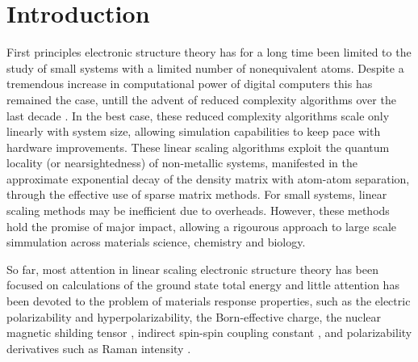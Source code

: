 \documentclass[prl,aps,letterpaper,twocolumn,showpacs,twocolumngrid,superbib]{revtex4}
\begin{document}
\section{Introduction}
First principles electronic structure theory  has  for a long time been limited to 
the study of small  systems with  a limited number of nonequivalent atoms. 
Despite a tremendous increase in computational power of digital computers this 
has remained the case, untill the advent of reduced complexity algorithms over the
last decade \cite{GGalli96,DBowler97,SGoedecker99,POrdejon00,VGogonea01,SWu02}. In the 
best case, these reduced complexity algorithms scale only linearly with system size, 
allowing simulation capabilities to keep pace with hardware improvements.
These linear scaling algorithms exploit the quantum locality (or nearsightedness) of 
non-metallic systems,  manifested in the approximate exponential decay of the density matrix 
with atom-atom separation, through the effective use of sparse matrix methods. For small systems,
linear scaling methods may be inefficient due to overheads.  However, these methods hold the promise 
of major impact, allowing a rigourous approach to large scale simmulation across materials science, 
chemistry and biology. 

 So far, most attention in linear scaling electronic structure theory 
 has been focused on calculations of the ground state total energy and 
 little attention has been devoted to the problem of materials response properties, 
 such as the electric polarizability and hyperpolarizability, the Born-effective charge,
 the nuclear magnetic shilding tensor \cite{Pulay_1990}, indirect spin-spin coupling
 constant \cite{Pennington_1991,Malkin_1996}, and polarizability derivatives such as 
 Raman intensity \cite{Lazzeri_2003,Champagne_2001}.
\end{document}
